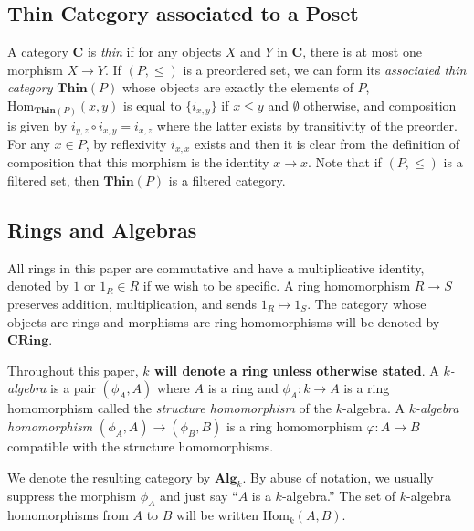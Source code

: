\documentclass[oneside,11pt]{amsart}
\newcommand{\bC}{\ensuremath{\textbf{C}}}
\newcommand{\bAlg}{\ensuremath{\textbf{Alg}}}
\newcommand{\bCRing}{\ensuremath{\textbf{CRing}}}
\newcommand{\bThin}{\ensuremath{\textbf{Thin}}}
\newcommand{\Hom}{\ensuremath{\text{Hom}}}
\theoremstyle{definition}
\newtheorem{proof techniques}{Proof Techniques}
\begin{document}

\subsection{Thin Category associated to a Poset} 

A category $\bC$ is \emph{thin} if for any objects $X$ and $Y$ in $\bC$, there is at most one morphism $X \to Y$. If $(P , \leq)$ is a preordered set, we can form its \emph{associated thin category} $\bThin(P)$ whose objects are exactly the elements of $P$, $\Hom_{\bThin(P)}(x , y)$ is equal to $\{ i_{x , y} \}$ if $x \leq y$ and $\emptyset$ otherwise, and composition is given by $i_{y , z} \circ i_{x, y} = i_{x , z}$ where the latter exists by transitivity of the preorder. For any $x \in P$, by reflexivity $i_{x , x}$ exists and then it is clear from the definition of composition that this morphism is the identity $x \to x$. Note that if $(P ,\leq)$ is a filtered set, then $\bThin(P)$ is a filtered category. 


\subsection{Rings and Algebras}

All rings in this paper are commutative and have a multiplicative identity, denoted by $1$ or $1_R \in R$ if we wish to be specific. A ring homomorphism $R \to S$ preserves addition, multiplication, and sends $1_R \mapsto 1_S$. The category whose objects are rings and morphisms are ring homomorphisms will be denoted by $\bCRing$. 

Throughout this paper, \textbf{$k$ will denote a ring unless otherwise stated}. A \emph{$k$-algebra} is a pair $(\phi_A , A)$ where $A$ is a ring and $\phi_A: k \to A$ is a ring homomorphism called the \emph{structure homomorphism} of the $k$-algebra. A \emph{$k$-algebra homomorphism} $(\phi_A , A) \to (\phi_B , B)$ is a ring homomorphism $\varphi: A \to B$ compatible with the structure homomorphisms. 

We denote the resulting category by $\bAlg_k$. By abuse of notation, we usually suppress the morphism $\phi_A$ and just say ``$A$ is a $k$-algebra.'' The set of $k$-algebra homomorphisms from $A$ to $B$ will be written $\Hom_k(A , B)$. 
\end{document}

